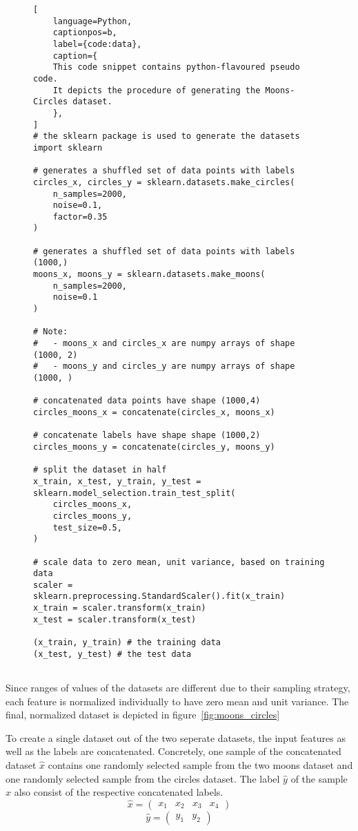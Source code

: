 \begin{figure}[ht]
\centering
\begin{minipage}{\linewidth}
\begin{lstlisting}[
    language=Python,
    captionpos=b, 
    label={code:data},
    caption={
    This code snippet contains python-flavoured pseudo code.
    It depicts the procedure of generating the Moons-Circles dataset.
    },
]
# the sklearn package is used to generate the datasets
import sklearn 

# generates a shuffled set of data points with labels
circles_x, circles_y = sklearn.datasets.make_circles(
    n_samples=2000, 
    noise=0.1, 
    factor=0.35
)

# generates a shuffled set of data points with labels (1000,)
moons_x, moons_y = sklearn.datasets.make_moons(
    n_samples=2000, 
    noise=0.1
)

# Note: 
#   - moons_x and circles_x are numpy arrays of shape (1000, 2) 
#   - moons_y and circles_y are numpy arrays of shape (1000, ) 

# concatenated data points have shape (1000,4)
circles_moons_x = concatenate(circles_x, moons_x)

# concatenate labels have shape shape (1000,2)
circles_moons_y = concatenate(circles_y, moons_y)

# split the dataset in half
x_train, x_test, y_train, y_test = sklearn.model_selection.train_test_split(
    circles_moons_x, 
    circles_moons_y, 
    test_size=0.5, 
)

# scale data to zero mean, unit variance, based on training data
scaler = sklearn.preprocessing.StandardScaler().fit(x_train)
x_train = scaler.transform(x_train)
x_test = scaler.transform(x_test)

(x_train, y_train) # the training data
(x_test, y_test) # the test data


\end{lstlisting}
\end{minipage}
\end{figure}

Since ranges of values of the datasets are different due to their sampling strategy, each feature is normalized individually to have zero mean and unit variance.
The final, normalized dataset is depicted in figure~\ref{fig:moons_circles}

To create a single dataset out of the two seperate datasets, the input features as well as the labels are concatenated.
Concretely, one sample of the concatenated dataset $\hat x$ contains one randomly selected sample from the two moons dataset and one randomly selected sample from the circles dataset.
The label $\hat y$ of the sample $\hat x$ also consist of the respective concatenated labels.
\[\hat x = \begin{pmatrix} x_1 & x_2 & x_3 & x_4 \end{pmatrix}\]
\[\hat y = \begin{pmatrix} y_1 & y_2 \end{pmatrix}\]

